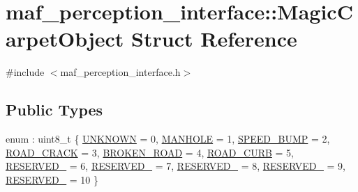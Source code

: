 \hypertarget{structmaf__perception__interface_1_1MagicCarpetObject}{}\section{maf\+\_\+perception\+\_\+interface\+:\+:Magic\+Carpet\+Object Struct Reference}
\label{structmaf__perception__interface_1_1MagicCarpetObject}


{\ttfamily \#include $<$maf\+\_\+perception\+\_\+interface.\+h$>$}

\subsection*{Public Types}
\begin{DoxyCompactItemize}
\item 
enum \+: uint8\+\_\+t \{ \newline
\hyperlink{structmaf__perception__interface_1_1MagicCarpetObject_a9c4c8d0efb3a8310d0013583949740acae1b8ac1ec31b449204d1411c5bd3433a}{U\+N\+K\+N\+O\+WN} = 0, 
\hyperlink{structmaf__perception__interface_1_1MagicCarpetObject_a9c4c8d0efb3a8310d0013583949740aca8ecf5cbc3302814861911c0fcdb0149d}{M\+A\+N\+H\+O\+LE} = 1, 
\hyperlink{structmaf__perception__interface_1_1MagicCarpetObject_a9c4c8d0efb3a8310d0013583949740aca8fa0bb85de6424f5db5a940b09dc000c}{S\+P\+E\+E\+D\+\_\+\+B\+U\+MP} = 2, 
\hyperlink{structmaf__perception__interface_1_1MagicCarpetObject_a9c4c8d0efb3a8310d0013583949740acac5f160647af735caaadcccb34527ef67}{R\+O\+A\+D\+\_\+\+C\+R\+A\+CK} = 3, 
\newline
\hyperlink{structmaf__perception__interface_1_1MagicCarpetObject_a9c4c8d0efb3a8310d0013583949740aca5274f124323716595bc7882a76a18ba1}{B\+R\+O\+K\+E\+N\+\_\+\+R\+O\+AD} = 4, 
\hyperlink{structmaf__perception__interface_1_1MagicCarpetObject_a9c4c8d0efb3a8310d0013583949740aca3af98c0e42fbf2a13749f6fd4b246a51}{R\+O\+A\+D\+\_\+\+C\+U\+RB} = 5, 
\hyperlink{structmaf__perception__interface_1_1MagicCarpetObject_a9c4c8d0efb3a8310d0013583949740acabd6e74b1fb36d2b4f0494d42f1bcc272}{R\+E\+S\+E\+R\+V\+E\+D\+\_} = 6, 
\hyperlink{structmaf__perception__interface_1_1MagicCarpetObject_a9c4c8d0efb3a8310d0013583949740acaf0b82cc464f802ffdcd084cc6a4164ef}{R\+E\+S\+E\+R\+V\+E\+D\+\_} = 7, 
\newline
\hyperlink{structmaf__perception__interface_1_1MagicCarpetObject_a9c4c8d0efb3a8310d0013583949740acaf09d961e0d5bd5c6c75639046220d5f2}{R\+E\+S\+E\+R\+V\+E\+D\+\_} = 8, 
\hyperlink{structmaf__perception__interface_1_1MagicCarpetObject_a9c4c8d0efb3a8310d0013583949740acaf94b0cbadac30d694f961d3150747601}{R\+E\+S\+E\+R\+V\+E\+D\+\_} = 9, 
\hyperlink{structmaf__perception__interface_1_1MagicCarpetObject_a9c4c8d0efb3a8310d0013583949740acac3de8c4f14d498d7bbe51052af75544d}{R\+E\+S\+E\+R\+V\+E\+D\+\_} = 10
 \}
\end{DoxyCompactItemize}
